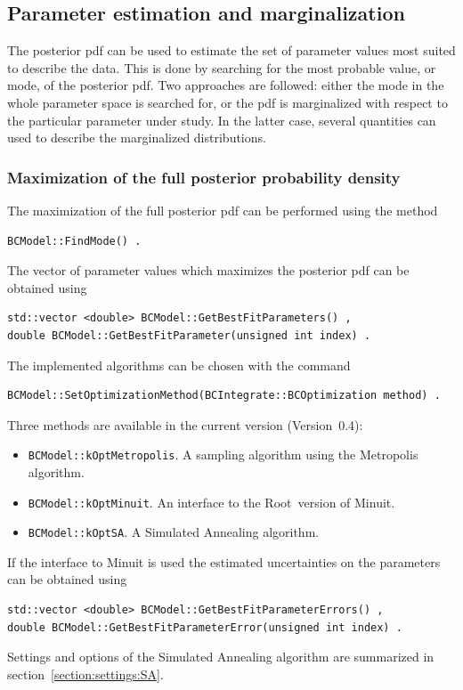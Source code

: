 \documentclass[11pt, a4paper]{article}
\newcommand{\Root}{{\sc Root}}
\newcommand{\versionno}{0.4}
\newcommand{\Version}{Version~\versionno}
\begin{document}
\subsection{Parameter estimation and marginalization}

The posterior pdf can be used to estimate the set of parameter values
most suited to describe the data. This is done by searching for the
most probable value, or mode, of the posterior pdf. Two approaches are
followed: either the mode in the whole parameter space is searched
for, or the pdf is marginalized with respect to the particular
parameter under study. In the latter case, several quantities can used
to describe the marginalized distributions.


\subsubsection{Maximization of the full posterior probability density}

The maximization of the full posterior pdf can be performed using the
method
%
\begin{verbatim}
BCModel::FindMode() .
\end{verbatim}

\noindent
The vector of parameter values which maximizes the posterior pdf can be obtained using
%
\begin{verbatim}
std::vector <double> BCModel::GetBestFitParameters() ,
double BCModel::GetBestFitParameter(unsigned int index) .
\end{verbatim}
%
The implemented algorithms can be chosen with the command
%
\begin{verbatim}
BCModel::SetOptimizationMethod(BCIntegrate::BCOptimization method) .
\end{verbatim}
%
Three methods are available in the current version (\Version):
%
\begin{itemize}
\item \verb|BCModel::kOptMetropolis|. A sampling algorithm using the
  Metropolis algorithm.
\item \verb|BCModel::kOptMinuit|. An interface to the \Root\ version
  of Minuit.
\item \verb|BCModel::kOptSA|. A Simulated Annealing algorithm.
\end{itemize}
%
If the interface to Minuit is used the estimated uncertainties on the
parameters can be obtained using
%
\begin{verbatim}
std::vector <double> BCModel::GetBestFitParameterErrors() ,
double BCModel::GetBestFitParameterError(unsigned int index) .
\end{verbatim}
%
Settings and options of the Simulated Annealing algorithm are
summarized in section~\ref{section:settings:SA}. \\
\end{document}
